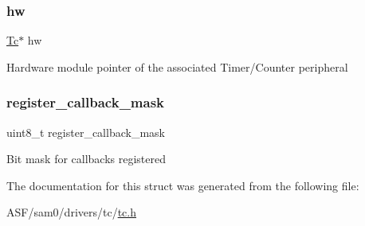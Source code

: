 \subsubsection{\texorpdfstring{hw}{hw}}
{\footnotesize\ttfamily \mbox{\hyperlink{union_tc}{Tc}}$\ast$ hw}

Hardware module pointer of the associated Timer/\+Counter peripheral \mbox{\label{structtc__module_a76596f8e0d1d5567da4bb6099bc15708}} 
\subsubsection{\texorpdfstring{register\_callback\_mask}{register\_callback\_mask}}
{\footnotesize\ttfamily uint8\+\_\+t register\+\_\+callback\+\_\+mask}

Bit mask for callbacks registered 

The documentation for this struct was generated from the following file\+:\begin{DoxyCompactItemize}
\item 
A\+S\+F/sam0/drivers/tc/\mbox{\hyperlink{drivers_2tc_2tc_8h}{tc.\+h}}\end{DoxyCompactItemize}
